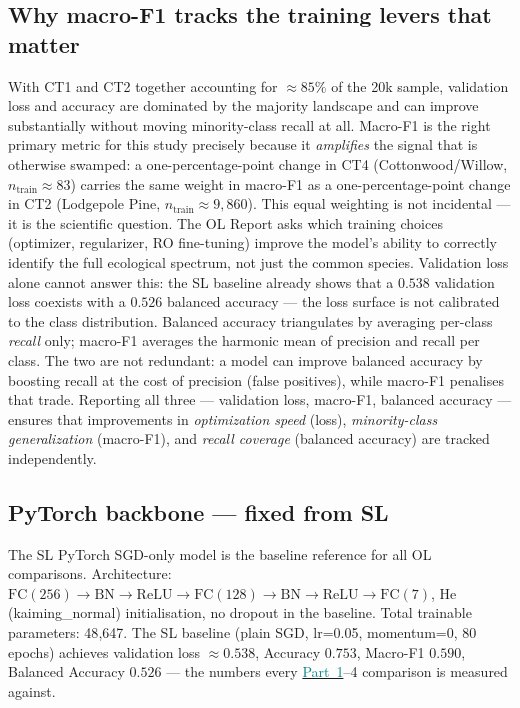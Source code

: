 \documentclass[conference]{IEEEtran}
\newcommand{\partref}[2]{\hyperref[#2]{\textcolor{teal}{Part~#1}}}
\begin{document}
\subsection{Why macro-F1 tracks the training levers that matter}\label{sec:data:metric}
With CT1 and CT2 together accounting for ${\approx}85\%$ of the 20k sample,
validation loss and accuracy are dominated by the majority landscape and
can improve substantially without moving minority-class recall at all.
Macro-F1 \cite{sokolova2009pra} is the right primary metric for this study
precisely because it \emph{amplifies} the signal that is otherwise swamped:
a one-percentage-point change in CT4 (Cottonwood/Willow, $n_\text{train}{\approx}83$)
carries the same weight in macro-F1 as a one-percentage-point change in
CT2 (Lodgepole Pine, $n_\text{train}{\approx}9{,}860$).
This equal weighting is not incidental --- it is the scientific question.
The OL Report asks which training choices (optimizer, regularizer, RO fine-tuning)
improve the model's ability to correctly identify the full ecological spectrum,
not just the common species.
Validation loss alone cannot answer this: the SL baseline already shows that
a $0.538$ validation loss coexists with a $0.526$ balanced accuracy ---
the loss surface is not calibrated to the class distribution.
Balanced accuracy triangulates by averaging per-class \emph{recall} only;
macro-F1 averages the harmonic mean of precision and recall per class.
The two are not redundant: a model can improve balanced accuracy by boosting
recall at the cost of precision (false positives), while macro-F1 penalises
that trade.
Reporting all three --- validation loss, macro-F1, balanced accuracy ---
ensures that improvements in \emph{optimization speed} (loss), \emph{minority-class
generalization} (macro-F1), and \emph{recall coverage} (balanced accuracy)
are tracked independently.

\subsection{PyTorch backbone --- fixed from SL}\label{sec:data:backbone}
The SL PyTorch SGD-only model is the baseline reference for all OL
comparisons.
Architecture: $\text{FC}(256)\to\text{BN}\to\text{ReLU}\to
\text{FC}(128)\to\text{BN}\to\text{ReLU}\to\text{FC}(7)$,
He (kaiming\_normal) initialisation, no dropout in the baseline.
Total trainable parameters: 48{,}647.
The SL baseline (plain SGD, lr=0.05, momentum=0, 80 epochs) achieves
validation loss ${\approx}0.538$, Accuracy $0.753$, Macro-F1 $0.590$,
Balanced Accuracy $0.526$ --- the numbers every \partref{1}{sec:p1}--4 comparison is
measured against.
\end{document}
